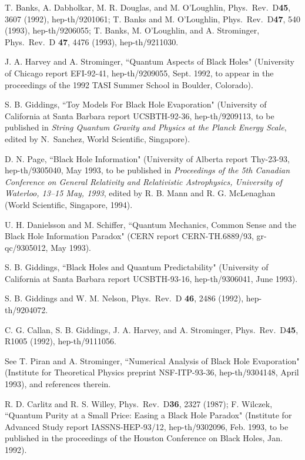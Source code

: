 \begin{thebibliography}{99}
 T. Banks, A. Dabholkar, M. R. Douglas, and M.
O'Loughlin,
Phys.\ Rev.\ D{\bf45}, 3607 (1992), hep-th/9201061;
T. Banks and M. O'Loughlin,  Phys.\ Rev.\ D{\bf 47}, 540 (1993),
hep-th/9206055; T. Banks, M. O'Loughlin, and A. Strominger, Phys.\
Rev.\ D
{\bf 47}, 4476 (1993), hep-th/9211030.

 J. A. Harvey and A. Strominger, ``Quantum Aspects of
Black Holes"
(University of Chicago report EFI-92-41, hep-th/9209055, Sept. 1992,
to appear
in the proceedings of the 1992 TASI Summer School in Boulder,
Colorado).

 S. B. Giddings, ``Toy Models For Black Hole
Evaporation"
(University of California at Santa Barbara report UCSBTH-92-36,
hep-th/9209113,
to be published in {\em String Quantum Gravity and Physics at the
Planck Energy
Scale}, edited by N.~Sanchez, World Scientific, Singapore).

 D. N. Page, ``Black Hole Information" (University of
Alberta report Thy-23-93, hep-th/9305040, May 1993, to be published
in
{\em Proceedings of the 5th Canadian Conference
on General Relativity and Relativistic Astrophysics,
University of Waterloo, 13--15 May, 1993}, edited by R. B. Mann and
R. G. McLenaghan (World Scientific, Singapore, 1994).

 U. H. Danielsson and M. Schiffer, ``Quantum
Mechanics,
Common Sense and the Black Hole Information Paradox"
(CERN report CERN-TH.6889/93, gr-qc/9305012, May 1993).

 S. B. Giddings, ``Black Holes and Quantum
Predictability"
(University of California at Santa Barbara report UCSBTH-93-16,
hep-th/9306041, June 1993).

 S. B. Giddings and W. M. Nelson, Phys.\ Rev.\ D{\bf
46}, 2486
(1992), hep-th/9204072.

 C. G. Callan, S. B. Giddings, J. A. Harvey, and A.
Strominger,
Phys.\ Rev.\ D{\bf 45}, R1005 (1992), hep-th/9111056.

 See T. Piran and A. Strominger, ``Numerical Analysis
of Black
Hole
Evaporation" (Institute for Theoretical Physics preprint
NSF-ITP-93-36,
hep-th/9304148, April 1993), and references therein.

 R. D. Carlitz and R. S. Willey, Phys.\ Rev.\ D{\bf 36},
2327
(1987); F. Wilczek, ``Quantum Purity at a Small Price: Easing a Black
Hole Paradox" (Institute for Advanced Study report IASSNS-HEP-93/12,
hep-th/9302096, Feb. 1993, to be published in the proceedings of the
Houston
Conference on Black Holes, Jan. 1992).


\end{thebibliography}
